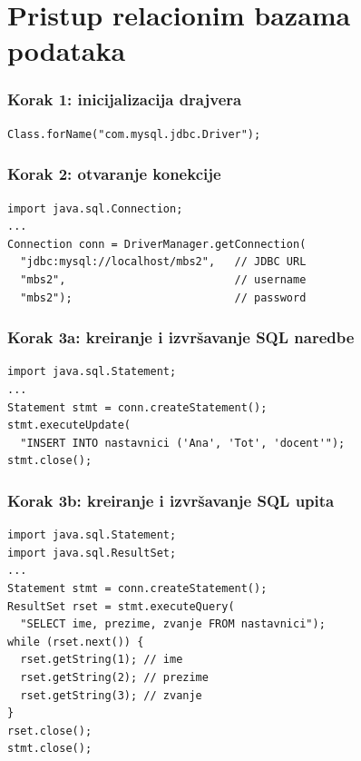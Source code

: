 \documentclass[compress]{beamer}
\begin{document}
\section[JDBC]{Pristup relacionim bazama podataka}
\begin{frame}[fragile]
  \frametitle{Korak 1: inicijalizacija drajvera}
\begin{verbatim}
Class.forName("com.mysql.jdbc.Driver");
\end{verbatim}
\end{frame}
\begin{frame}[fragile]
  \frametitle{Korak 2: otvaranje konekcije}
\begin{verbatim}
import java.sql.Connection;
...
Connection conn = DriverManager.getConnection(
  "jdbc:mysql://localhost/mbs2",   // JDBC URL
  "mbs2",                          // username
  "mbs2");                         // password
\end{verbatim}
\end{frame}
\begin{frame}[fragile]
  \frametitle{Korak 3a: kreiranje i izvršavanje SQL naredbe}
\begin{verbatim}
import java.sql.Statement;
...
Statement stmt = conn.createStatement();
stmt.executeUpdate(
  "INSERT INTO nastavnici ('Ana', 'Tot', 'docent'");
stmt.close();
\end{verbatim}
\end{frame}
\begin{frame}[fragile]
  \frametitle{Korak 3b: kreiranje i izvršavanje SQL upita}
\begin{verbatim}
import java.sql.Statement;
import java.sql.ResultSet;
...
Statement stmt = conn.createStatement();
ResultSet rset = stmt.executeQuery(
  "SELECT ime, prezime, zvanje FROM nastavnici");
while (rset.next()) {
  rset.getString(1); // ime
  rset.getString(2); // prezime
  rset.getString(3); // zvanje
}
rset.close();
stmt.close();
\end{verbatim}
\end{frame}
\end{document}
